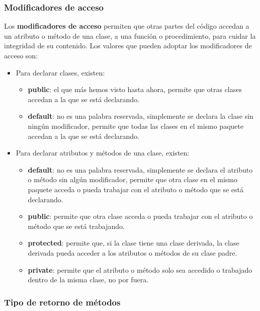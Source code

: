 \subsubsection{Modificadores de acceso}

Los \textbf{modificadores de acceso} permiten que otras partes del código accedan a un atributo o método de una clase, a una función o procedimiento, para cuidar la integridad de su contenido. Los valores que pueden adoptar los modificadores de acceso son:
\begin{itemize}
    \item Para declarar clases, existen:
        \begin{itemize}
            \item \textbf{public}: el que más hemos visto hasta ahora, permite que otras clases accedan a la que se está declarando.
            \item \textbf{default}: no es una palabra reservada, simplemente se declara la clase sin ningún modificador, permite que todas las clases en el mismo paquete accedan a la que se está declarando.
        \end{itemize}
    \item Para declarar atributos y métodos de una clase, existen:
        \begin{itemize}
            \item \textbf{default}: no es una palabra reservada, simplemente se declara el atributo o método sin algún modificador, permite que otra clase en el mismo paquete acceda o pueda trabajar con el atributo o método que se está declarando.
            \item \textbf{public}: permite que otra clase acceda o pueda trabajar con el atributo o método que se está trabajando.
            \item \textbf{protected}: permite que, si la clase tiene una clase derivada, la clase derivada pueda acceder a los atributos o métodos de su clase padre.
            \item \textbf{private}: permite que el atributo o método solo sea accedido o trabajado dentro de la misma clase, no por fuera.
        \end{itemize}
\end{itemize}


\subsubsection{Tipo de retorno de métodos}

